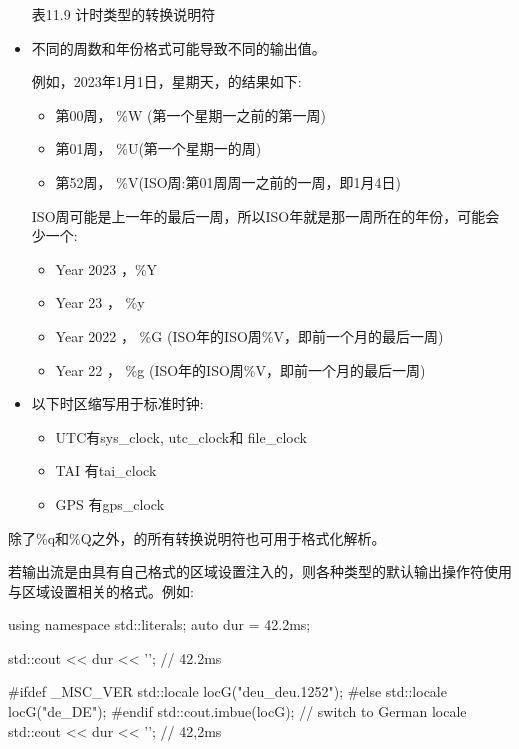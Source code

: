 \begin{itemize}
\begin{center}
表11.9 计时类型的转换说明符
\end{center}

\item
不同的周数和年份格式可能导致不同的输出值。

例如，2023年1月1日，星期天，的结果如下:

\begin{itemize}
\item
第00周， \%W (第一个星期一之前的第一周)

\item
第01周， \%U(第一个星期一的周)

\item
第52周， \%V(ISO周:第01周周一之前的一周，即1月4日)
\end{itemize}

ISO周可能是上一年的最后一周，所以ISO年就是那一周所在的年份，可能会少一个:

\begin{itemize}
\item
Year 2023 ，\%Y

\item
Year 23 ， \%y

\item
Year 2022 ， \%G (ISO年的ISO周\%V，即前一个月的最后一周)

\item
Year 22 ， \%g (ISO年的ISO周\%V，即前一个月的最后一周)
\end{itemize}

\item
以下时区缩写用于标准时钟:

\begin{itemize}
\item
UTC有sys\_clock, utc\_clock和 file\_clock

\item
TAI 有tai\_clock

\item
GPS 有gps\_clock
\end{itemize}
\end{itemize}

除了\%q和\%Q之外，的所有转换说明符也可用于格式化解析。


若输出流是由具有自己格式的区域设置注入的，则各种类型的默认输出操作符使用与区域设置相关的格式。例如:

\begin{cpp}
using namespace std::literals;
auto dur = 42.2ms;

std::cout << dur << '\n'; // 42.2ms

#ifdef _MSC_VER
	std::locale locG("deu_deu.1252");
#else
	std::locale locG("de_DE");
#endif
std::cout.imbue(locG); // switch to German locale
std::cout << dur << '\n'; // 42,2ms
\end{cpp}

